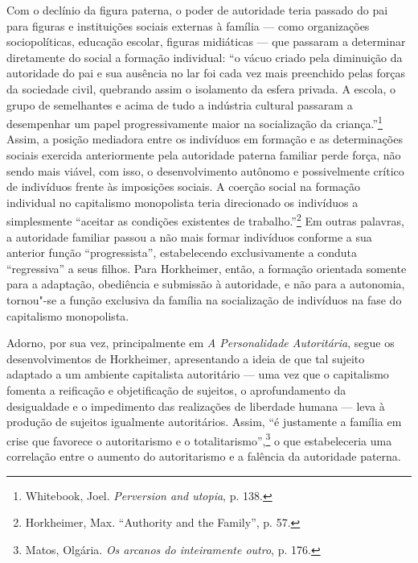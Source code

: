 Com o declínio da figura paterna, o poder de autoridade teria passado do
pai para figuras e instituições sociais externas à família --- como
organizações sociopolíticas, educação escolar, figuras midiáticas --- que
passaram a determinar diretamente do social a formação individual: ``o
vácuo criado pela diminuição da autoridade do pai e sua ausência no lar
foi cada vez mais preenchido pelas forças da sociedade civil, quebrando
assim o isolamento da esfera privada. A escola, o grupo de semelhantes e
acima de tudo a indústria cultural passaram a desempenhar um papel
progressivamente maior na socialização da criança.''\footnote{Whitebook,
  Joel. \emph{Perversion and utopia}, p. 138.} Assim, a posição
mediadora entre os indivíduos em formação e as determinações sociais
exercida anteriormente pela autoridade paterna familiar perde força, não
sendo mais viável, com isso, o desenvolvimento autônomo e possivelmente
crítico de indivíduos frente às imposições sociais. A coerção social na
formação individual no capitalismo monopolista teria direcionado os
indivíduos a simplesmente ``aceitar as condições existentes de
trabalho.''\footnote{Horkheimer, Max. ``Authority and the Family'', p.
  57.} Em outras palavras, a autoridade familiar passou a não mais
formar indivíduos conforme a sua anterior função ``progressista'',
estabelecendo exclusivamente a conduta ``regressiva'' a seus filhos.
Para Horkheimer, então, a formação orientada somente para a adaptação,
obediência e submissão à autoridade, e não para a autonomia, tornou"-se a
função exclusiva da família na socialização de indivíduos na fase do
capitalismo monopolista.

Adorno, por sua vez, principalmente em \emph{A Personalidade
Autoritária}, segue os desenvolvimentos de Horkheimer, apresentando a
ideia de que tal sujeito adaptado a um ambiente capitalista autoritário
--- uma vez que o capitalismo fomenta a reificação e objetificação de
sujeitos, o aprofundamento da desigualdade e o impedimento das
realizações de liberdade humana --- leva à produção de sujeitos
igualmente autoritários. Assim, ``é justamente a família em crise que
favorece o autoritarismo e o totalitarismo'',\footnote{Matos, Olgária.
  \emph{Os arcanos do inteiramente outro}, p. 176.} o que estabeleceria
uma correlação entre o aumento do autoritarismo e a falência da
autoridade paterna.

